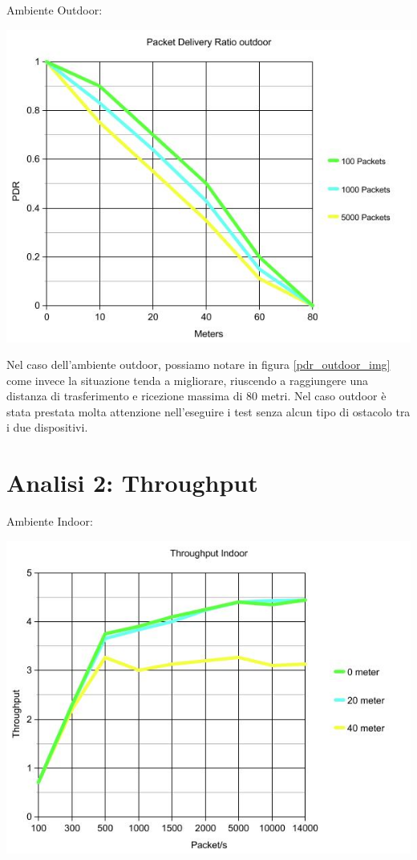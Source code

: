 Ambiente Outdoor:
\begin{center}
\includegraphics[width=1\textwidth]{imgs/PDR_Outdoor_New.jpg}
\label{pdr_outdoor_img}%
\end{center}

Nel caso dell'ambiente outdoor, possiamo notare in figura \ref{pdr_outdoor_img} come invece la situazione tenda a migliorare, riuscendo a raggiungere una distanza di trasferimento e ricezione massima di 80 metri.
Nel caso outdoor è stata prestata molta attenzione nell'eseguire i test senza alcun tipo di ostacolo tra i due dispositivi.
\newpage

\section{Analisi 2: Throughput}

Ambiente Indoor:
\begin{center}
\includegraphics[width=1\textwidth]{imgs/ThroughputIndoor.jpg}
\label{throughputindoor_img}%
\end{center}


